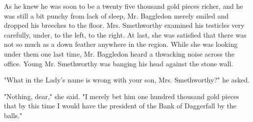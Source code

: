As he knew he was soon to be a twenty five thousand gold pieces richer, and he was still a bit punchy from lack of sleep, Mr. Baggledon merely smiled and dropped his breeches to the floor. Mrs. Smethworthy examined his testicles very carefully, under, to the left, to the right. At last, she was satisfied that there was not so much as a down feather anywhere in the region. While she was looking under them one last time, Mr. Baggledon heard a thwacking noise across the office. Young Mr. Smethworthy was banging his head against the stone wall.

"What in the Lady's name is wrong with your son, Mrs. Smethworthy?" he asked.

"Nothing, dear," she said. "I merely bet him one hundred thousand gold pieces that by this time I would have the president of the Bank of Daggerfall by the balls."